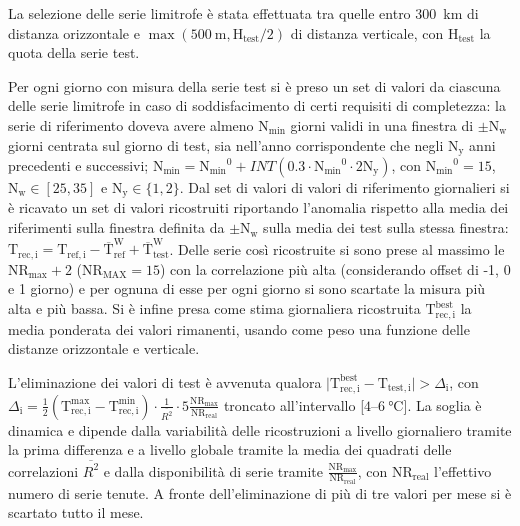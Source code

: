 La selezione delle serie limitrofe è stata effettuata tra quelle entro \qty{300}{\kilo\meter} di distanza orizzontale e \(\max(\qty{500}{\meter}, \mathrm{H_{test}}/2)\) di distanza verticale, con \(\mathrm{H_{test}}\) la quota della serie test.

Per ogni giorno con misura della serie test si è preso un set di valori da ciascuna delle serie limitrofe in caso di soddisfacimento di certi requisiti di completezza: la serie di riferimento doveva avere almeno \(\mathrm{N_{\min}}\) giorni validi in una finestra di \(\pm\mathrm{N_w}\) giorni centrata sul giorno di test, sia nell'anno corrispondente che negli \(\mathrm{N_y}\) anni precedenti e successivi; \(\mathrm{N_{\min}} = \mathrm{N_{\min}}^0 + INT(0.3\cdot\mathrm{N_{\min}}^0\cdot2\mathrm{N_y})\), con \(\mathrm{N_{\min}}^0 = 15\), \(\mathrm{N_w} \in [25, 35]\) e \(\mathrm{N_y} \in \{1, 2\} \). Dal set di valori di valori di riferimento giornalieri si è ricavato un set di valori ricostruiti riportando l'anomalia rispetto alla media dei riferimenti sulla finestra definita da \(\pm \mathrm{N_w}\) sulla media dei test sulla stessa finestra: \(\mathrm{T_{rec,i}} = \mathrm{T_{ref,i}} - \mathrm{\overline{T}_{ref}^W} + \mathrm{\overline{T}_{test}^W}\). Delle serie così ricostruite si sono prese al massimo le \(\mathrm{NR_{\max}} + 2\) (\(\mathrm{NR_{MAX}} = 15\)) con la correlazione più alta (considerando offset di -1, 0 e 1 giorno) e per ognuna di esse per ogni giorno si sono scartate la misura più alta e più bassa. Si è infine presa come stima giornaliera ricostruita \(\mathrm{T_{rec,i}^{best}}\) la media ponderata dei valori rimanenti, usando come peso una funzione delle distanze orizzontale e verticale.

L'eliminazione dei valori di test è avvenuta qualora \(\lvert \mathrm{T_{rec,i}^{best}} - \mathrm{T_{test,i}} \rvert > \Delta_\mathrm{i}\), con \(\Delta_\mathrm{i} = \frac{1}{2}(\mathrm{T_{rec,i}^{\max} - T_{rec,i}^{\min}})\cdot\frac{1}{\overline{R^2}}\cdot5\frac{\mathrm{NR_{\max}}}{\mathrm{NR_{real}}}\) troncato all'intervallo [\(\num{4}\)--\(\qty{6}{\degreeCelsius}\)]. La soglia è dinamica e dipende dalla variabilità delle ricostruzioni a livello giornaliero tramite la prima differenza e a livello globale tramite la media dei quadrati delle correlazioni \(\overline{R^2}\) e dalla disponibilità di serie tramite \(\frac{\mathrm{NR_{\max}}}{\mathrm{NR_{real}}}\), con \(\mathrm{NR_{real}}\) l'effettivo numero di serie tenute. A fronte dell'eliminazione di più di tre valori per mese si è scartato tutto il mese.